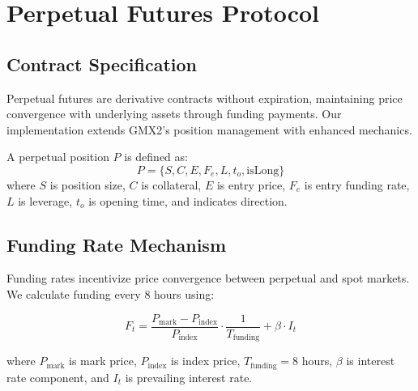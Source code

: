 \section{Perpetual Futures Protocol}


\subsection{Contract Specification}

Perpetual futures are derivative contracts without expiration, maintaining price convergence with underlying assets through funding payments. Our implementation extends GMX2's position management with enhanced mechanics.

\begin{definition}
A perpetual position $P$ is defined as:
\begin{equation}
P = \{S, C, E, F_e, L, t_o, \text{isLong}\}
\end{equation}
where $S$ is position size, $C$ is collateral, $E$ is entry price, $F_e$ is entry funding rate, $L$ is leverage, $t_o$ is opening time, and  indicates direction.
\end{definition}

\subsection{Funding Rate Mechanism}

Funding rates incentivize price convergence between perpetual and spot markets. We calculate funding every 8 hours using:

\begin{equation}
F_t = \frac{P_{\text{mark}} - P_{\text{index}}}{P_{\text{index}}} \cdot \frac{1}{T_{\text{funding}}} + \beta \cdot I_t
\end{equation}

where $P_{\text{mark}}$ is mark price, $P_{\text{index}}$ is index price, $T_{\text{funding}} = 8$ hours, $\beta$ is interest rate component, and $I_t$ is prevailing interest rate.


